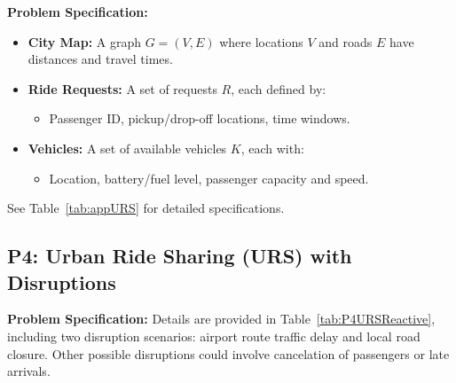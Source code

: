 \textbf{Problem Specification:}
\begin{itemize}[leftmargin=1.0em, topsep=-.0em, parsep=-.0em, label=-]
    \item \textbf{City Map:} A graph $G = (V, E)$ where locations $V$ and roads $E$ have distances and travel times.
    \item \textbf{Ride Requests:} A set of requests $R$, each defined by:
    \begin{itemize}[leftmargin=1.0em, topsep=-.0em, parsep=-.0em, label=--]
        \item Passenger ID, pickup/drop-off locations, time windows.
    \end{itemize}
    \item \textbf{Vehicles:} A set of available vehicles $K$, each with:
    \begin{itemize}[leftmargin=1.0em, topsep=-.0em, parsep=-.0em, label=--]
        \item Location, battery/fuel level, passenger capacity and speed.
    \end{itemize}
\end{itemize}
\vspace{.1in}
See Table~\ref{tab:appURS} for detailed specifications.


\subsection*{P4: Urban Ride Sharing (URS) with Disruptions}

\noindent \textbf{Problem Specification:} Details are provided in Table~\ref{tab:P4URSReactive}, including two disruption scenarios: airport route traffic delay and local road closure. Other possible disruptions could involve cancelation of passengers or late arrivals.

